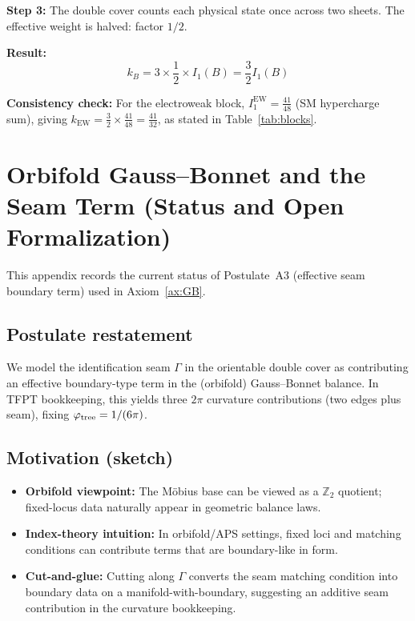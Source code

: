 \textbf{Step 3:} The double cover counts each physical state once across two sheets. 
The effective weight is halved: factor $1/2$.

\textbf{Result:}
\begin{equation}
    k_B = 3 \times \frac{1}{2} \times I_1(B) = \frac{3}{2} I_1(B)
\end{equation}

\textbf{Consistency check:} For the electroweak block, 
$I_1^{\text{EW}} = \frac{41}{48}$ (SM hypercharge sum), giving 
$k_{\text{EW}} = \frac{3}{2} \times \frac{41}{48} = \frac{41}{32}$, 
as stated in Table~\ref{tab:blocks}.

\section{Orbifold Gauss--Bonnet and the Seam Term (Status and Open Formalization)}
\label{app:seam}

This appendix records the current status of Postulate~A3 (effective seam boundary term) used in Axiom~\ref{ax:GB}.

\subsection{Postulate restatement}
We model the identification seam $\Gamma$ in the orientable double cover as contributing an effective boundary-type term in the (orbifold) Gauss--Bonnet balance. 
In TFPT bookkeeping, this yields three $2\pi$ curvature contributions (two edges plus seam), fixing $\varphi_{\mathrm{tree}} = 1/(6\pi)$.

\subsection{Motivation (sketch)}
\begin{itemize}[leftmargin=1.5em, topsep=2pt, itemsep=1pt]
    \item \textbf{Orbifold viewpoint:} The M\"obius base can be viewed as a $\mathbb{Z}_2$ quotient; fixed-locus data naturally appear in geometric balance laws.
    \item \textbf{Index-theory intuition:} In orbifold/APS settings, fixed loci and matching conditions can contribute terms that are boundary-like in form.
    \item \textbf{Cut-and-glue:} Cutting along $\Gamma$ converts the seam matching condition into boundary data on a manifold-with-boundary, suggesting an additive seam contribution in the curvature bookkeeping.
\end{itemize}

